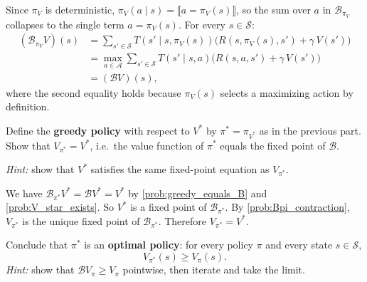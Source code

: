 \documentclass[11pt]{article}
\newcommand{\cS}{\mathcal{S}}
\newcommand{\cA}{\mathcal{A}}
\begin{document}
\begin{solution}
Since $\pi_V$ is deterministic, $\pi_V(a \mid s) = \llbracket a = \pi_V(s) \rrbracket$, so the sum over $a$ in $\mathcal{B}_{\pi_V}$ collapses to the single term $a = \pi_V(s)$. For every $s \in \cS$:
\begin{align*}
(\mathcal{B}_{\pi_V} V)(s) &= \sum_{s' \in \cS} T(s' \mid s, \pi_V(s))\bigl(R(s,\pi_V(s),s') + \gamma\, V(s')\bigr) \\
&= \max_{a \in \cA} \sum_{s' \in \cS} T(s' \mid s, a)\bigl(R(s,a,s') + \gamma\, V(s')\bigr) \\
&= (\mathcal{B} V)(s),
\end{align*}
where the second equality holds because $\pi_V(s)$ selects a maximizing action by definition.
\end{solution}

\begin{exercise}
\label{prob:V_pi_star} Define the \textbf{greedy policy} with respect to $V^*$ by $\pi^* = \pi_{V^*}$ as in the previous part.
Show that $V_{\pi^*} = V^*$, i.e.\ the value function of $\pi^*$ equals the fixed point of $\mathcal{B}$.

\textit{Hint:} show that $V^*$ satisfies the same fixed-point equation as $V_{\pi^*}$.
\end{exercise}

\begin{solution}
We have $\mathcal{B}_{\pi^*} V^* = \mathcal{B} V^* = V^*$ by \cref{prob:greedy_equals_B} and \cref{prob:V_star_exists}.
So $V^*$ is a fixed point of $\mathcal{B}_{\pi^*}$. By \cref{prob:Bpi_contraction}, $V_{\pi^*}$ is the unique fixed point of $\mathcal{B}_{\pi^*}$. Therefore $V_{\pi^*} = V^*$.
\end{solution}

\begin{exercise}
\label{prob:optimality} Conclude that $\pi^*$ is an \textbf{optimal policy}: for every policy $\pi$ and every state $s \in \cS$,
$$
V_{\pi^*}(s) \ge V_\pi(s).
$$
\textit{Hint:} show that $\mathcal{B} V_\pi \ge V_\pi$ pointwise, then iterate and take the limit.
\end{exercise}
\end{document}
